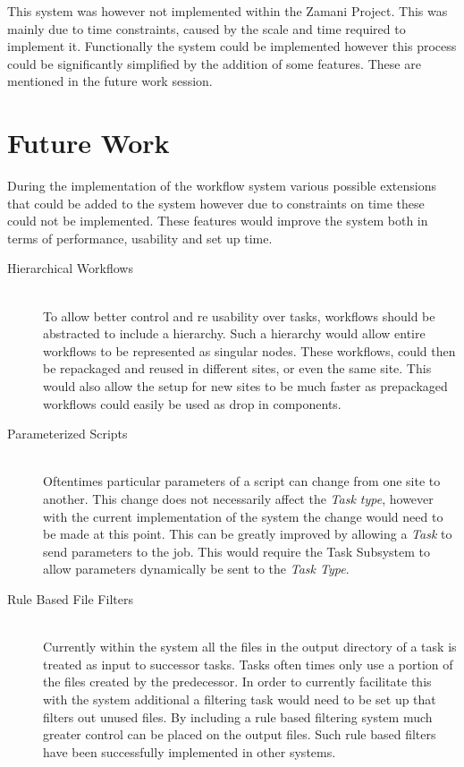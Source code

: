 \documentclass[12pt,a4paper]{report}
\begin{document}
This system was however not implemented within the Zamani Project. This was
mainly due to time constraints, caused by the scale and time required to
implement it. Functionally the system could be implemented however this process
could be significantly simplified by the addition of some features. These are
mentioned in the future work session.


\section{Future Work}
During the implementation of the workflow system various possible extensions
that could be added to the system however due to constraints on time these could
not be implemented. These features would improve the system both in terms of
performance, usability and set up time. 
\begin{description}
\item[Hierarchical Workflows]\hfill \\
To allow better control and re usability over tasks, workflows should be
abstracted to include a hierarchy. Such a hierarchy would allow entire workflows
to be represented as singular nodes. These workflows, could then be repackaged
and reused in different sites, or even the same site. This would also allow the
setup for new sites to be much faster as prepackaged workflows could easily be
used as drop in components.
\item[Parameterized Scripts]\hfill \\
Oftentimes particular parameters of a script can change from one site to
another. This change does not necessarily affect the \emph{Task type}, however
with the current implementation of the system the change would need to be made
at this point. This can be greatly improved by allowing a \emph{Task} to send
parameters to the job. This would require the Task Subsystem to allow parameters
dynamically be sent to the \emph{Task Type}.
\item[Rule Based File Filters]\hfill \\
Currently within the system all the files in the output directory of a task is
treated as input to successor tasks. Tasks often times only use a portion of the
files created by the predecessor. In order to currently facilitate this with the
system additional a filtering task would need to be set up that filters out
unused files. By including a rule based filtering system much greater control
can be placed on the output files. Such rule based filters have been
successfully implemented in other systems\cite{conery2005rule}.

\end{description}
\end{document}
